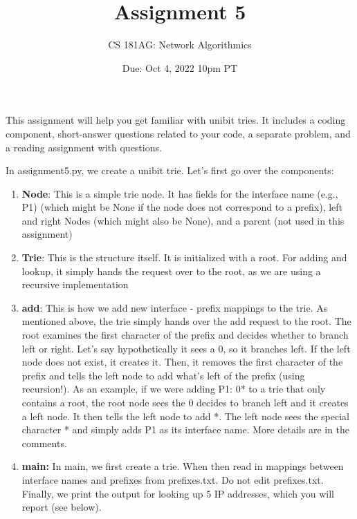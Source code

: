 \documentclass[10pt]{article}
\date{Due: Oct 4, 2022 10pm PT}
\newenvironment{problem}[2][Problem]{\begin{trivlist}
\item[\hskip \labelsep {\bfseries #1}\hskip \labelsep {\bfseries #2.}]}{\end{trivlist}}
\begin{document}
 
\title{Assignment 5}
\author{
CS 181AG: Network Algorithmics}
\maketitle

This assignment will help you get familiar with unibit tries. It includes a coding component, short-answer questions related to your code, a separate problem, and a reading assignment with questions.  

 
\begin{problem}{1: Trie to Return the Correct Interface}
In assignment5.py, we create a unibit trie. Let's first go over the components:
\begin{enumerate}
    \item \textbf{Node}: This is a simple trie node. It has fields for the interface name (e.g., P1) (which might be None if the node does not correspond to a prefix), left and right Nodes (which might also be None), and a parent (not used in this assignment)
    \item \textbf{Trie}: This is the structure itself. It is initialized with a root. For adding and lookup, it simply hands the request over to the root, as we are using a recursive implementation
    \item \textbf{add}: This is how we add new interface - prefix mappings to the trie. As mentioned above, the trie simply hands over the add request to the root. The root examines the first character of the prefix and decides whether to branch left or right. Let's say hypothetically it sees a 0, so it branches left. If the left node does not exist, it creates it. Then, it removes the first character of the prefix and tells the left node to add what's left of the prefix (using recursion!). As an example, if we were adding P1: 0* to a trie that only contains a root, the root node sees the 0 decides to branch left and it creates a left node. It then tells the left node to add *. The left node sees the special character * and simply adds P1 as its interface name. More details are in the comments.
    \item \textbf{main:} In main, we first create a trie. When then read in mappings between interface names and prefixes from prefixes.txt. Do not edit prefixes.txt. Finally, we print the output for looking up 5 IP addresses, which you will report (see below).
    

\end{enumerate}
\end{problem}
\end{document}
